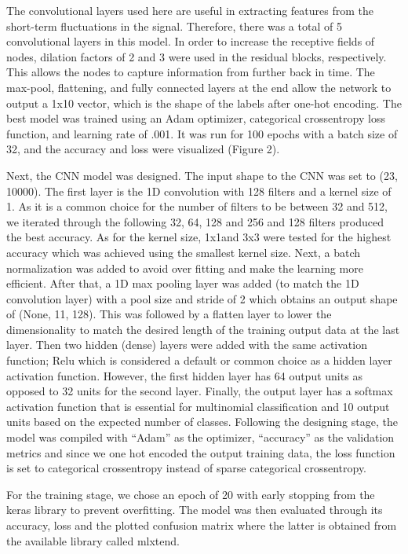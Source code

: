 \documentclass[conference]{IEEEtran}
\begin{document}
The convolutional layers used here are useful in extracting features from the short-term fluctuations in the signal. Therefore, there was a total of 5 convolutional layers in this model. In order to increase the receptive fields of nodes, dilation factors of 2 and 3 were used in the residual blocks, respectively. This allows the nodes to capture information from further back in time. The max-pool, flattening, and fully connected layers at the end allow the network to output a 1x10 vector, which is the shape of the labels after one-hot encoding. \newline
The best model was trained using an Adam optimizer, categorical crossentropy loss function, and learning rate of .001. It was run for 100 epochs with a batch size of 32, and the accuracy and loss were visualized (Figure 2).

Next, the CNN model was designed. The input shape to the CNN was set to (23, 10000). The first layer is the 1D convolution with 128 filters and a kernel size of 1. As it is a common choice for the number of filters to be between 32 and 512, we iterated through the following 32, 64, 128 and 256 and 128 filters produced the best accuracy. As for the kernel size, 1x1and 3x3 were tested for the highest accuracy which was achieved using the smallest kernel size. Next, a batch normalization was added to avoid over fitting and make the learning more efficient. After that, a 1D max pooling layer was added (to match the 1D convolution layer) with a pool size and stride of 2 which obtains an output shape of (None, 11, 128). This was followed by a flatten layer to lower the dimensionality to match the desired length of the training output data at the last layer. Then two hidden (dense) layers were added with the same activation function; Relu which is considered a default or common choice as a hidden layer activation function. However, the first hidden layer has 64 output units as opposed to 32 units for the second layer. Finally, the output layer has a softmax activation function that is essential for multinomial classification and 10 output units based on the expected number of classes. Following the designing stage, the model was compiled with “Adam” as the optimizer, “accuracy” as the validation metrics and since we one hot encoded the output training data, the loss function is set to categorical crossentropy instead of sparse categorical crossentropy.

For the training stage, we chose an epoch of 20 with early stopping from the keras library to prevent overfitting. The model was then evaluated through its accuracy, loss and the plotted confusion matrix where the latter is obtained from the available library called mlxtend. 
\end{document}
